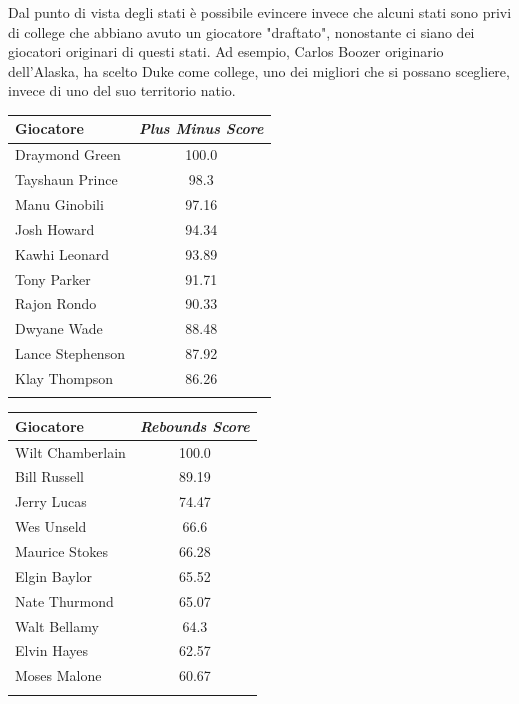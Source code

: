 \documentclass[10.5pt,a4paper,twocolumn]{article}
\begin{document}
Dal punto di vista degli stati è possibile evincere invece che alcuni stati sono privi di college che abbiano avuto un giocatore "draftato", nonostante ci siano dei giocatori originari di questi stati. Ad esempio, Carlos Boozer originario dell'Alaska, ha scelto Duke come college, uno dei migliori che si possano scegliere, invece di uno del suo territorio natio.

\begin{table}[t]
	\parbox{.45\linewidth}{
		\begin{tabular}{lc}
			Giocatore & \textit{Plus Minus Score}  \\
			\hline
			Draymond Green & 100.0\\
			Tayshaun Prince & 98.3\\
			Manu Ginobili & 97.16\\
			Josh Howard & 94.34\\
			Kawhi Leonard & 93.89\\
			Tony Parker & 91.71\\
			Rajon Rondo & 90.33\\
			Dwyane Wade & 88.48\\
			Lance Stephenson & 87.92\\
			Klay Thompson & 86.26\\
			&\\
		\end{tabular}
	}
	\quad
	\hspace{20pt}
	\parbox{.45\linewidth}{
		\begin{tabular}{lc}
			Giocatore & \textit{Rebounds Score}  \\
			\hline
			Wilt Chamberlain & 100.0\\
			Bill Russell & 89.19\\
			Jerry Lucas & 74.47\\
			Wes Unseld & 66.6\\
			Maurice Stokes & 66.28\\
			Elgin Baylor & 65.52\\
			Nate Thurmond & 65.07\\
			Walt Bellamy & 64.3\\
			Elvin Hayes & 62.57\\
			Moses Malone & 60.67\\
			&\\
			
		\end{tabular}
	}
	

\end{table}
\end{document}
